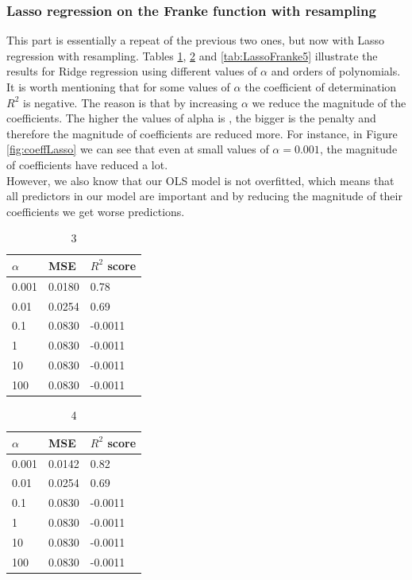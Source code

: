 \documentclass [11pt]{article}
\begin{document}
\subsubsection{Lasso regression on the Franke function  with resampling}
 
This part is essentially a repeat of the previous two ones, but now with Lasso regression with resampling. Tables \ref{tab:LassoFranke3}, \ref{tab:LassoFranke4} and \ref{tab:LassoFranke5} illustrate the results for Ridge regression using different values of $\alpha$ and orders of polynomials.\\
It is worth mentioning that for some values of $\alpha$ the coefficient of determination $R^{2}$ is negative. The reason is that by increasing $\alpha$ we reduce the magnitude of the coefficients. The higher the values of alpha is , the bigger is the penalty and therefore the magnitude of coefficients are reduced more. For instance, in Figure \ref{fig:coeffLasso} we can see that even at small values of $\alpha=0.001$, the magnitude of coefficients have reduced a lot.\\

However, we also know that our OLS model is not overfitted, which means that all predictors in our model are important and by reducing the magnitude of their coefficients we get worse predictions. 


\begin{table}[H]
\centering
\begin{tabular}{lll}
\hline
$\alpha$ & MSE    & $R^{2}$ score \\ \hline
0.001     & 0.0180 & 0.78          \\
0.01      & 0.0254 & 0.69          \\
0.1       & 0.0830 & -0.0011       \\
1         & 0.0830 & -0.0011       \\
10        & 0.0830 & -0.0011       \\
100       & 0.0830 & -0.0011       \\ \hline
\end{tabular}
\caption{3}
\label{tab:LassoFranke3}
\end{table}

\begin{table}[H]
\centering
\begin{tabular}{lll}
\hline
$\alpha$ & MSE    & $R^{2}$ score \\ \hline
0.001     & 0.0142 & 0.82          \\
0.01      & 0.0254 & 0.69          \\
0.1       & 0.0830 & -0.0011       \\
1         & 0.0830 & -0.0011       \\
10        & 0.0830 & -0.0011       \\
100       & 0.0830 & -0.0011       \\ \hline
\end{tabular}
\caption{4}
\label{tab:LassoFranke4}
\end{table}
\end{document}
